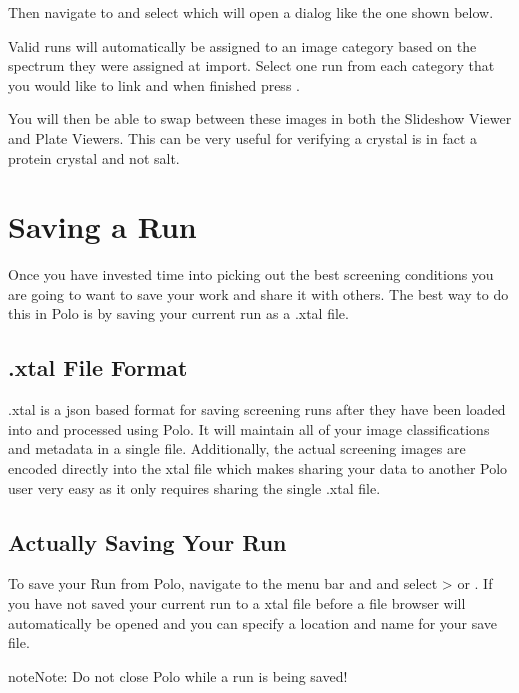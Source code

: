 \documentclass[letterpaper,10pt,english]{sphinxmanual}
\begin{document}
Then navigate to  and select  which will
open a dialog like the one shown below.

Valid runs will automatically be assigned to an image category based on the
spectrum they were assigned at import. Select one run from each category that
you would like to link and when finished press .

You will then be able to swap between these images in both the Slideshow Viewer
and Plate Viewers. This can be very useful for verifying a crystal is in fact
a protein crystal and not salt.


\section{Saving a Run}
\label{\detokenize{user_guide:saving-a-run}}
Once you have invested time into picking out the best screening conditions you
are going to want to save your work and share it with others. The best way to
do this in Polo is by saving your current run as a .xtal file.


\subsection{.xtal File Format}
\label{\detokenize{user_guide:xtal-file-format}}
.xtal is a json based format for saving screening runs after they have been
loaded into and processed using Polo. It will maintain all of your image
classifications and metadata in a single file. Additionally, the actual
screening images are encoded directly into the xtal file which makes sharing
your data to another Polo user very easy as it only requires sharing the
single .xtal file.


\subsection{Actually Saving Your Run}
\label{\detokenize{user_guide:actually-saving-your-run}}
To save your Run from Polo, navigate to the menu bar and and select
 \sphinxhyphen{}\textgreater{}  or . If you have not saved your current run
to a xtal file before a file browser will automatically be opened and you
can specify a location and name for your save file.

\begin{sphinxadmonition}{note}{Note:}
Do not close Polo while a run is being saved!
\end{sphinxadmonition}
\end{document}
